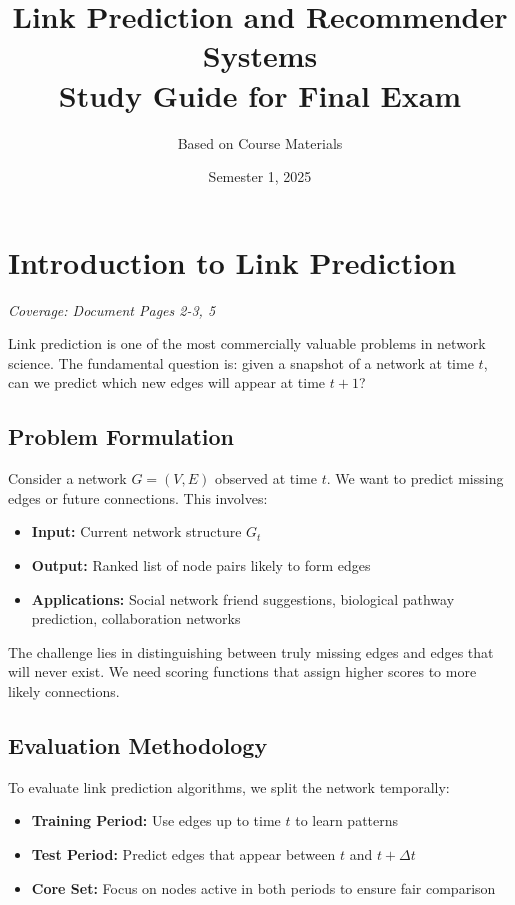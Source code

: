 \documentclass[11pt,a4paper]{article}
\title{\textbf{Link Prediction and Recommender Systems}\\
\large Study Guide for Final Exam}
\author{Based on Course Materials}
\date{Semester 1, 2025}
\begin{document}
\maketitle

\tableofcontents
\newpage

\section{Introduction to Link Prediction}
\textit{Coverage: Document Pages 2-3, 5}

Link prediction is one of the most commercially valuable problems in network science. The fundamental question is: given a snapshot of a network at time $t$, can we predict which new edges will appear at time $t+1$?

\subsection{Problem Formulation}
Consider a network $G = (V, E)$ observed at time $t$. We want to predict missing edges or future connections. This involves:

\begin{itemize}
\item \textbf{Input:} Current network structure $G_t$
\item \textbf{Output:} Ranked list of node pairs likely to form edges
\item \textbf{Applications:} Social network friend suggestions, biological pathway prediction, collaboration networks
\end{itemize}

The challenge lies in distinguishing between truly missing edges and edges that will never exist. We need scoring functions that assign higher scores to more likely connections.

\subsection{Evaluation Methodology}
To evaluate link prediction algorithms, we split the network temporally:
\begin{itemize}
\item \textbf{Training Period:} Use edges up to time $t$ to learn patterns
\item \textbf{Test Period:} Predict edges that appear between $t$ and $t+\Delta t$
\item \textbf{Core Set:} Focus on nodes active in both periods to ensure fair comparison
\end{itemize}
\end{document}
